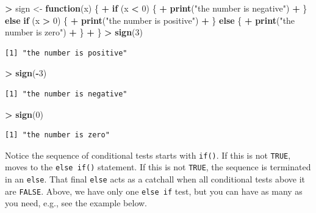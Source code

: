 \documentclass[]{krantz}
\makeatletter
\newenvironment{Shaded}{\begin{snugshade}}{\end{snugshade}}
\newcommand{\KeywordTok}[1]{\textcolor[rgb]{0.27,0.27,0.27}{\textbf{#1}}}
\newcommand{\DecValTok}[1]{\textcolor[rgb]{0.06,0.06,0.06}{#1}}
\newcommand{\StringTok}[1]{\textcolor[rgb]{0.5,0.5,0.5}{#1}}
\newcommand{\ControlFlowTok}[1]{\textcolor[rgb]{0.27,0.27,0.27}{\textbf{#1}}}
\newcommand{\OperatorTok}[1]{\textcolor[rgb]{0.43,0.43,0.43}{\textbf{#1}}}
\newcommand{\NormalTok}[1]{#1}
\newenvironment{kframe}{%
\medskip{}
\setlength{\fboxsep}{.8em}
 \def\at@end@of@kframe{}%
 \ifinner\ifhmode%
  \def\at@end@of@kframe{\end{minipage}}%
  \begin{minipage}{\columnwidth}%
 \fi\fi%
 \def\FrameCommand##1{\hskip\@totalleftmargin \hskip-\fboxsep
 \colorbox{shadecolor}{##1}\hskip-\fboxsep
     \hskip-\linewidth \hskip-\@totalleftmargin \hskip\columnwidth}%
 \MakeFramed {\advance\hsize-\width
   \@totalleftmargin\z@ \linewidth\hsize
   \@setminipage}}%
 {\par\unskip\endMakeFramed%
 \at@end@of@kframe}
\renewenvironment{Shaded}{\begin{kframe}}{\end{kframe}}
\theoremstyle{definition}
\theoremstyle{definition}
\theoremstyle{definition}
\theoremstyle{remark}
\makeatother
\begin{document}
\begin{Shaded}
\begin{Highlighting}[]
\OperatorTok{>}\StringTok{ }\NormalTok{sign <-}\StringTok{ }\ControlFlowTok{function}\NormalTok{(x) \{}
\OperatorTok{+}\StringTok{   }\ControlFlowTok{if}\NormalTok{ (x }\OperatorTok{<}\StringTok{ }\DecValTok{0}\NormalTok{) \{}
\OperatorTok{+}\StringTok{     }\KeywordTok{print}\NormalTok{(}\StringTok{"the number is negative"}\NormalTok{)}
\OperatorTok{+}\StringTok{   }\NormalTok{\} }\ControlFlowTok{else} \ControlFlowTok{if}\NormalTok{ (x }\OperatorTok{>}\StringTok{ }\DecValTok{0}\NormalTok{) \{}
\OperatorTok{+}\StringTok{     }\KeywordTok{print}\NormalTok{(}\StringTok{"the number is positive"}\NormalTok{)}
\OperatorTok{+}\StringTok{   }\NormalTok{\} }\ControlFlowTok{else}\NormalTok{ \{}
\OperatorTok{+}\StringTok{     }\KeywordTok{print}\NormalTok{(}\StringTok{"the number is zero"}\NormalTok{)}
\OperatorTok{+}\StringTok{   }\NormalTok{\}}
\OperatorTok{+}\StringTok{ }\NormalTok{\}}
\OperatorTok{>}\StringTok{ }\KeywordTok{sign}\NormalTok{(}\DecValTok{3}\NormalTok{)}
\end{Highlighting}
\end{Shaded}

\begin{verbatim}
[1] "the number is positive"
\end{verbatim}

\begin{Shaded}
\begin{Highlighting}[]
\OperatorTok{>}\StringTok{ }\KeywordTok{sign}\NormalTok{(}\OperatorTok{-}\DecValTok{3}\NormalTok{)}
\end{Highlighting}
\end{Shaded}

\begin{verbatim}
[1] "the number is negative"
\end{verbatim}

\begin{Shaded}
\begin{Highlighting}[]
\OperatorTok{>}\StringTok{ }\KeywordTok{sign}\NormalTok{(}\DecValTok{0}\NormalTok{)}
\end{Highlighting}
\end{Shaded}

\begin{verbatim}
[1] "the number is zero"
\end{verbatim}

Notice the sequence of conditional tests starts with \texttt{if()}. If
this is not \texttt{TRUE}, moves to the \texttt{else\ if()} statement.
If this is not \texttt{TRUE}, the sequence is terminated in an
\texttt{else}. That final \texttt{else} acts as a catchall when all
conditional tests above it are \texttt{FALSE}. Above, we have only one
\texttt{else\ if} test, but you can have as many as you need, e.g., see
the example below.
\end{document}
